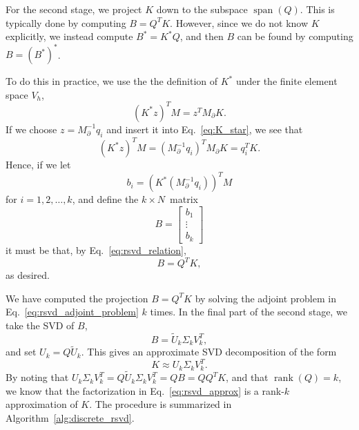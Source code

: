 For the second stage, we project $K$ down to the subspace $\operatorname{span}(Q)$. This is typically done by computing $B = Q^T K$. However, since we do not know $K$ explicitly, we instead compute $B^* = K^* Q$, and then $B$ can be found by computing $B = (B^*)^*$.

To do this in practice, we use the the definition of $K^*$ under the finite element space $V_h$,
\begin{equation}\label{eq:K_star}
    (K^* z)^T M = z^T M_\partial K.
\end{equation}
If we choose $z = M_{\partial}^{-1} q_i$ and insert it into Eq.~\eqref{eq:K_star}, we see that
\begin{equation}\label{eq:rsvd_relation}
    (K^* z)^T M
    = (M_{\partial}^{-1} q_i)^T M_{\partial} K
    = q_i^T K.
\end{equation}
Hence, if we let
\begin{equation}\label{eq:rsvd_adjoint_problem}
    b_i = (K^* (M_{\partial}^{-1} q_i))^T M
\end{equation}
for $i = 1, 2, \dots, k$, and define the $k \times N$ matrix
\begin{equation}
    B = \begin{bmatrix} b_1 \\ \vdots \\ b_k \end{bmatrix}
\end{equation}
it must be that, by Eq.~\eqref{eq:rsvd_relation},
\begin{equation}
    B = Q^T K,
\end{equation}
as desired.

We have computed the projection $B = Q^T K$ by solving the adjoint problem in Eq.~\eqref{eq:rsvd_adjoint_problem} $k$ times. In the final part of the second stage, we take the SVD of $B$,
\begin{equation}
    B = \tilde U_k \Sigma_k V_k^T,
\end{equation}
and set $U_k = Q \tilde U_k$. This gives an approximate SVD decomposition of the form
\begin{equation}\label{eq:rsvd_approx}
    K \approx U_k \Sigma_k V_k^T.
\end{equation}
By noting that $U_k \Sigma_k V_k^T = Q \tilde U_k \Sigma_k V_k^T = Q B = Q Q^T K$, and that $\operatorname{rank}(Q) = k$, we know that the factorization in Eq.~\eqref{eq:rsvd_approx} is a rank-$k$ approximation of $K$. The procedure is summarized in Algorithm~\ref{alg:discrete_rsvd}.


